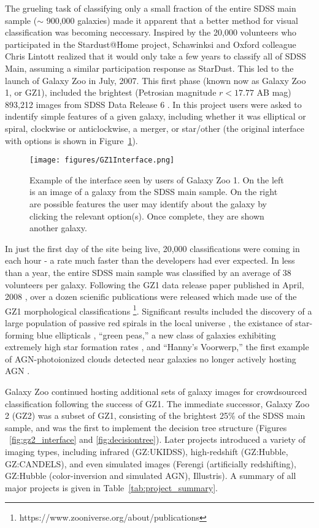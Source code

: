 The grueling task of classifying only a small fraction of the entire SDSS main sample ($\sim$ 900,000 galaxies) made it apparent that a better method for visual classification was becoming neccessary. Inspired by the 20,000 volunteers who participated in the Stardust@Home project, Schawinksi and Oxford colleague Chris Lintott realized that it would only take a few years to classify all of SDSS Main, assuming a similar participation response as StarDust. This led to the launch of Galaxy Zoo in July, 2007. This first phase (known now as Galaxy Zoo 1, or GZ1), included the brightest (Petrosian magnitude $r < 17.77$ AB mag) 893,212 images from SDSS Data Release 6 \citep{Strauss2002,AdelmanMcCarthy2008}. In this project users were asked to indentify simple features of a given galaxy, including whether it was elliptical or spiral, clockwise or anticlockwise, a merger, or star/other (the original interface with options is shown in Figure~\ref{GZ1_Interface}). 

\begin{figure}
\centering
\texttt{[image: figures/GZ1Interface.png]}
\caption{Example of the interface seen by users of Galaxy Zoo 1. On the left is an image of a galaxy from the SDSS main sample. On the right are possible features the user may identify about the galaxy by clicking the relevant option(s). Once complete, they are shown another galaxy.}
\label{GZ1_Interface}
\end{figure}

In just the first day of the site being live, 20,000 classifications were coming in each hour - a rate much faster than the developers had ever expected. In less than a year, the entire SDSS main sample was classified by an average of 38 volunteers per galaxy. Following the GZ1 data release paper published in April, 2008 \citep{Lintott2008}, over a dozen scienific publications were released which made use of the GZ1 morphological classifications \footnote{https://www.zooniverse.org/about/publications}. Significant results included the discovery of a large population of passive red spirals in the local universe \citep{Masters2010}, the existance of star-forming blue ellipticals \citep{Schawinski2009b}, ``green peas,'' a new class of galaxies exhibiting extremely high star formation rates \citep{Cardamone2009}, and ``Hanny's Voorwerp,'' the first example of AGN-photoionized clouds detected near galaxies no longer actively hosting AGN \citep{Lintott2009}. 

Galaxy Zoo continued hosting additional sets of galaxy images for crowdsourced classification following the success of GZ1. The immediate successor, Galaxy Zoo 2 (GZ2) was a subset of GZ1, consisting of the brightest 25\% of the SDSS main sample, and was the first to implement the decision tree structure (Figures ~\ref{fig:gz2_interface} and \ref{fig:decisiontree}). Later projects introduced a variety of imaging types, including infrared (GZ:UKIDSS), high-redshift (GZ:Hubble, GZ:CANDELS), and even simulated images (Ferengi (artificially redshifting), GZ:Hubble (color-inversion and simulated AGN), Illustris). A summary of all major projects is given in Table~\ref{tab:project_summary}. 

